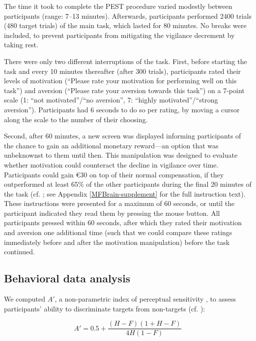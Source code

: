 \documentclass[11pt,english,]{memoir}
\begin{document}
The time it took to complete the PEST procedure varied modestly between participants (range: 7--13 minutes). Afterwards, participants performed 2400 trials (480 target trials) of the main task, which lasted for 80 minutes. No breaks were included, to prevent participants from mitigating the vigilance decrement by taking rest.

There were only two different interruptions of the task. First, before starting the task and every 10 minutes thereafter (after 300 trials), participants rated their levels of motivation (``Please rate your motivation for performing well on this task'') and aversion (``Please rate your aversion towards this task'') on a 7-point scale (1: ``not motivated''/``no aversion'', 7: ``highly motivated''/``strong aversion''). Participants had 6 seconds to do so per rating, by moving a cursor along the scale to the number of their choosing.

Second, after 60 minutes, a new screen was displayed informing participants of the chance to gain an additional monetary reward---an option that was unbeknownst to them until then. This manipulation was designed to evaluate whether motivation could counteract the decline in vigilance over time. Participants could gain €30 on top of their normal compensation, if they outperformed at least 65\% of the other participants during the final 20 minutes of the task (cf. \textcite{Lorist2009}; see Appendix \ref{MFBrain-supplement} for the full instruction text). These instructions were presented for a maximum of 60 seconds, or until the participant indicated they read them by pressing the mouse button. All participants pressed within 60 seconds, after which they rated their motivation and aversion one additional time (such that we could compare these ratings immediately before and after the motivation manipulation) before the task continued.

\hypertarget{behavioral-data-analysis}{%
\subsection{Behavioral data analysis}\label{behavioral-data-analysis}}

We computed \(A'\), a non-parametric index of perceptual sensitivity \autocite{Stanislaw1999}, to assess participants' ability to discriminate targets from non-targets (cf. \textcite{MacLean2009}):

\begin{equation*}
  A' = 0.5 + \frac{(H-F)(1+H-F)}{4H(1-F)}
\end{equation*}
\end{document}
